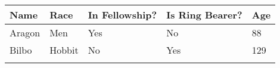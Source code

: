 \documentclass[
]{article}
\begin{document}
\begin{longtable}[]{@{}lllll@{}}
\toprule
\begin{minipage}[b]{0.11\columnwidth}\raggedright
Name\strut
\end{minipage} & \begin{minipage}[b]{0.11\columnwidth}\raggedright
Race\strut
\end{minipage} & \begin{minipage}[b]{0.25\columnwidth}\raggedright
In Fellowship?\strut
\end{minipage} & \begin{minipage}[b]{0.24\columnwidth}\raggedright
Is Ring Bearer?\strut
\end{minipage} & \begin{minipage}[b]{0.07\columnwidth}\raggedright
Age\strut
\end{minipage}\tabularnewline
\midrule
\endhead
\begin{minipage}[t]{0.11\columnwidth}\raggedright
Aragon\strut
\end{minipage} & \begin{minipage}[t]{0.11\columnwidth}\raggedright
Men\strut
\end{minipage} & \begin{minipage}[t]{0.25\columnwidth}\raggedright
Yes\strut
\end{minipage} & \begin{minipage}[t]{0.24\columnwidth}\raggedright
No\strut
\end{minipage} & \begin{minipage}[t]{0.07\columnwidth}\raggedright
88\strut
\end{minipage}\tabularnewline
\begin{minipage}[t]{0.11\columnwidth}\raggedright
Bilbo\strut
\end{minipage} & \begin{minipage}[t]{0.11\columnwidth}\raggedright
Hobbit\strut
\end{minipage} & \begin{minipage}[t]{0.25\columnwidth}\raggedright
No\strut
\end{minipage} & \begin{minipage}[t]{0.24\columnwidth}\raggedright
Yes\strut
\end{minipage} & \begin{minipage}[t]{0.07\columnwidth}\raggedright
129\strut
\end{minipage}\tabularnewline
\begin{minipage}[t]{0.11\columnwidth}\raggedright

\end{minipage}
\end{longtable}
\end{document}
